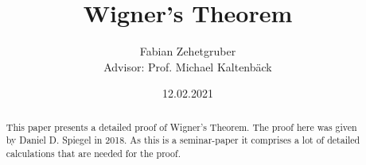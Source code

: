 \documentclass{article}
\title
{
  Wigner's Theorem
}
\author
{
  Fabian Zehetgruber \\ [1cm]{\small Advisor: Prof. Michael Kaltenbäck}
}
\date{12.02.2021}
\begin{document}
	
\maketitle

\begin{abstract}
	This paper presents a detailed proof of Wigner's Theorem. The proof here was given by Daniel D. Spiegel in 2018. As this is a seminar-paper it comprises a lot of detailed calculations that are needed for the proof.
\end{abstract}















\printbibliography
\end{document}
